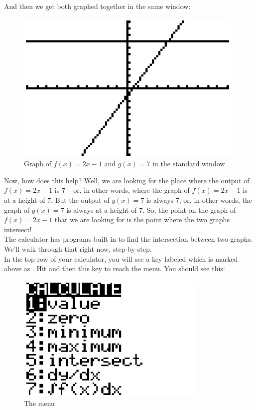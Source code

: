 And then we get both graphed together in the same window:

\begin{figure}[H]
	\centering
	\includegraphics[scale=1.0]{Sections/SolvingEquationsGraphically/Figure04.png}
	\caption{Graph of $f(x)=2x-1$ and $g(x)=7$ in the standard window}
\end{figure}

Now, how does this help? Well, we are looking for the place where the output of $f(x)=2x-1$ is $7$ -- or, in other words, where the graph of $f(x)=2x-1$ is at a height of $7$. But the output of $g(x)=7$ is always $7$, or, in other words, the graph of $g(x)=7$ is always at a height of $7$. So, the point on the graph of $f(x)=2x-1$ that we are looking for is the point where the two graphs intersect!\\

The calculator has programs built in to find the intersection between two graphs. We’ll walk through that right now, step-by-step.\\

In the top row of your calculator, you will see a key labeled  which is marked above as . Hit  and then this key to reach the  menu. You should see this:

\begin{figure}[H]
	\centering
	\includegraphics[scale=1.0]{Sections/SolvingEquationsGraphically/Figure05.png}
	\caption{The  menu}
\end{figure}

